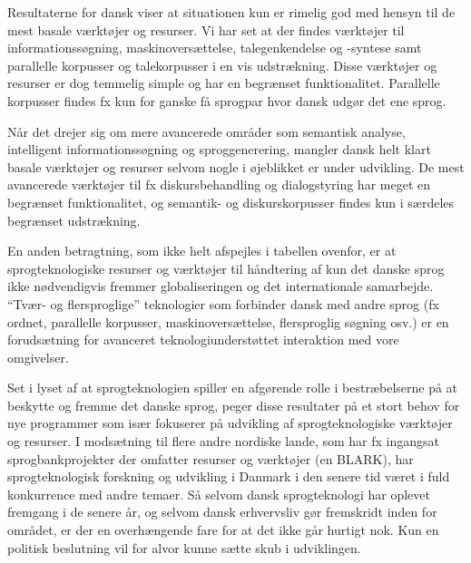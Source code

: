 \begin{multicols}{2}
Resultaterne for dansk viser at situationen kun er rimelig god med hensyn til de mest basale v\ae rkt\o jer og resurser. Vi har set at der findes v\ae rkt\o jer til informationss\o g\-ning, maskinovers\ae ttelse, talegenkendelse og -syntese samt parallelle korpusser og talekorpusser i en vis udstr\ae kning. Disse v\ae rkt\o jer og resurser er dog temmelig simple og har en begr\ae nset funktionalitet. Parallelle kor\-pusser findes fx kun for ganske \mbox{f\aa} sprogpar hvor dansk udg\o r det ene sprog.

N\aa r det drejer sig om mere avancerede omr\aa der som semantisk analyse, intelligent informationss\o gning og sproggenerering, mangler dansk helt klart basale v\ae rkt\o jer og resurser selvom nogle i \o jeblikket er under udvikling. De mest avancerede v\ae rkt\o jer til fx diskursbehandling og dialogstyring har meget en begr\ae nset funktionalitet, og semantik- og diskurskorpusser findes kun i s\ae rdeles begr\ae nset udstr\ae kning. 

En anden betragtning, som ikke helt afspejles i tabellen ovenfor, er at sprogteknologiske resurser og v\ae rkt\o jer til h\aa ndtering af kun det danske sprog ikke n\o dvendigvis fremmer globaliseringen og det internationale samarbej\-de.  ``Tv\ae r- og flersproglige'' teknologier som forbinder dansk med andre sprog (fx ordnet, parallelle korpusser, maskinovers\ae ttelse, flersproglig s\o gning osv.) er en foruds\ae tning for avanceret teknologiunderst\o ttet interaktion med vore omgivelser. 

Set i lyset af at sprogteknologien spiller en afg\o rende rolle i bestr\ae belserne \mbox{p\aa} at beskytte og fremme det danske sprog, peger disse resultater \mbox{p\aa} et stort behov for nye programmer som is\ae r fokuserer \mbox{p\aa} udvikling af sprogteknologiske v\ae rkt\o jer og resurser.  I mods\ae tning til flere andre nordiske lande, som har fx ingangsat sprogbankprojekter der omfatter resurser og v\ae rkt\o jer (en BLARK), har sprogteknologisk forskning og udvikling i Danmark i den senere tid v\ae ret i fuld konkurrence med andre temaer.  \mbox{S\aa} selvom dansk sprogtek\-nologi har oplevet fremgang i de senere \aa r, og selvom dansk erhvervsliv g\o r fremskridt inden for omr\aa det, er der en overh\ae ngende fare for at det ikke g\aa r hurtigt nok. Kun en politisk beslutning vil for alvor kunne s\ae tte skub i udviklingen. 



\end{multicols}

